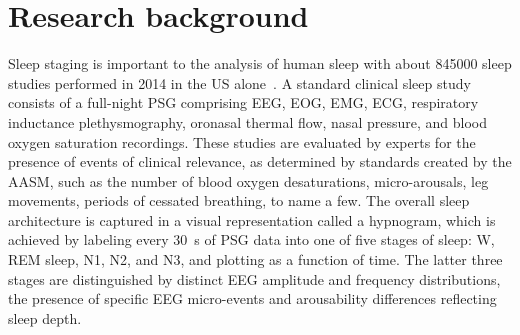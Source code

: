 \section{Research background}


Sleep staging is important to the analysis of human sleep with about \num{845000} sleep studies performed in 2014 in the US alone~\cite{Chiao2017}. 
A standard clinical sleep study consists of a full-night \ac{PSG} comprising \ac{EEG}, \ac{EOG}, \ac{EMG}, \ac{ECG}, respiratory inductance plethysmography, oronasal thermal flow, nasal pressure, and blood oxygen saturation recordings.
These studies are evaluated by experts for the presence of events of clinical relevance, as determined by standards created by the \ac{AASM}, such as the number of blood oxygen desaturations, micro-arousals, leg movements, periods of cessated breathing, to name a few. 
The overall sleep architecture is captured in a visual representation called a hypnogram, which is achieved by labeling every \SI{30}{\second} of \ac{PSG} data into one of five stages of sleep: \ac{W}, \ac{REM} sleep, \ac{N1}, \ac{N2}, and \ac{N3}, and plotting as a function of time. 
The latter three stages are distinguished by distinct \ac{EEG} amplitude and frequency distributions, the presence of specific \ac{EEG} micro-events and arousability differences reflecting sleep depth.

